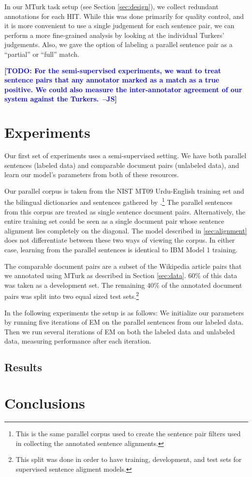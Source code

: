\documentclass[11pt,letterpaper]{article}
\newcommand{\Note}[1]{\textbf{\large\textcolor{blue}{[#1]}}}
\newcommand{\NoteJS}[1]{\Note{#1~--JS}}
\begin{document}
In our MTurk task setup (see Section \ref{sec:design}), we collect redundant
annotations for each HIT. While this was done primarily for quality control, and
it is more convenient to use a single judgement for each sentence pair, we can
perform a more fine-grained analysis by looking at the individual Turkers'
judgements. Also, we gave the option of labeling a parallel sentence pair as a
``partial'' or ``full'' match.

\NoteJS{TODO: For the semi-supervised experiments, we want to treat sentence
pairs that any annotator marked as a match as a true positive. We could also
measure the inter-annotator agreement of our system against the Turkers.}

\section{Experiments}
\label{sec:unsup_experiments}
Our first set of experiments uses a semi-supervised setting. We have both
parallel sentences (labeled data) and comparable document pairs (unlabeled data),
and learn our model's parameters from both of these resources.

Our parallel corpus is taken from the NIST MT09 Urdu-English training set
and the bilingual dictionaries and sentences gathered by
.\footnote{This is the same parallel corpus used to create the
sentence pair filters used in collecting the annotated sentence alignments.}
The parallel sentences from this corpus are treated as single sentence document
pairs. Alternatively, the entire training set could be seen as a single document
pair whose sentence alignment lies completely on the diagonal. The model
described in \ref{sec:alignment} does not differentiate between these two ways
of viewing the corpus. In either case, learning from the parallel sentences is
identical to IBM Model 1 training.

The comparable document pairs are a subset of the Wikipedia article pairs that
we annotated using MTurk as described in Section \ref{sec:data}. $60\%$ of this
data was taken as a development set. The remaining $40\%$ of the annotated
document pairs was split into two equal sized test sets.\footnote{This split was
done in order to have training, development, and test sets for supervised
sentence aligment models.}

In the following experiments the setup is as follows: We initialize our
parameters by running five iterations of EM on the parallel sentences from our
labeled data. Then we run several iterations of EM on both the labeled data and
unlabeled data, measuring performance after each iteration.

\subsection{Results}

\section{Conclusions}



\end{document}
